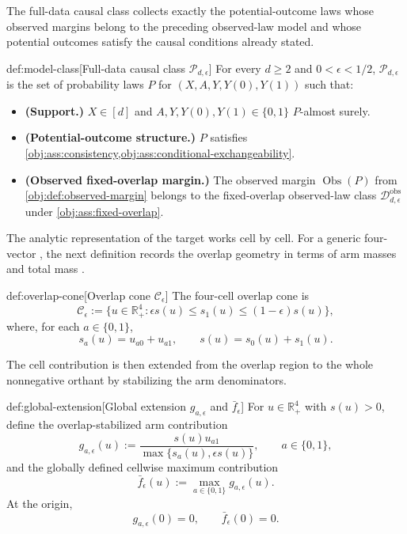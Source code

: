 The full-data causal class collects exactly the potential-outcome laws whose observed margins belong to the preceding observed-law model and whose potential outcomes satisfy the causal conditions already stated.

\begin{definitionv}{def:model-class}[Full-data causal class \(\mathcal P_{d,\epsilon}\)]
For every \(d\geq 2\) and \(0<\epsilon<1/2\), \(\mathcal P_{d,\epsilon}\) is the set of probability laws \(P\) for \((X,A,Y,Y(0),Y(1))\) such that:
\begin{itemize}
\item \textbf{(Support.)} \(X\in[d]\) and \(A,Y,Y(0),Y(1)\in\{0,1\}\) \(P\)-almost surely.
\item \textbf{(Potential-outcome structure.)} \(P\) satisfies \cref{obj:ass:consistency,obj:ass:conditional-exchangeability}.
\item \textbf{(Observed fixed-overlap margin.)} The observed margin \(\operatorname{Obs}(P)\) from \cref{obj:def:observed-margin} belongs to the fixed-overlap observed-law class \(\mathcal D_{d,\epsilon}^{\mathrm{obs}}\) under \cref{obj:ass:fixed-overlap}.
\end{itemize}
\end{definitionv}

The analytic representation of the target works cell by cell. For a generic four-vector , the next definition records the overlap geometry in terms of arm masses  and total mass .

\begin{definitionv}{def:overlap-cone}[Overlap cone \(\mathcal C_\epsilon\)]
The four-cell overlap cone is
\[
\mathcal C_\epsilon
:=
\{u\in\mathbb R_+^4:\epsilon s(u)\leq s_1(u)\leq(1-\epsilon)s(u)\},
\]
where, for each \(a\in\{0,1\}\),
\[
s_a(u)=u_{a0}+u_{a1},
\qquad
s(u)=s_0(u)+s_1(u).
\]
\end{definitionv}

The cell contribution is then extended from the overlap region to the whole nonnegative orthant by stabilizing the arm denominators.

\begin{definitionv}{def:global-extension}[Global extension \(g_{a,\epsilon}\) and \(\bar f_\epsilon\)]
For \(u\in\mathbb R_+^4\) with \(s(u)>0\), define the overlap-stabilized arm contribution
\[
g_{a,\epsilon}(u)
:=
\frac{s(u)u_{a1}}{\max\{s_a(u),\epsilon s(u)\}},
\qquad a\in\{0,1\},
\]
and the globally defined cellwise maximum contribution
\[
\bar f_\epsilon(u)
:=
\max_{a\in\{0,1\}} g_{a,\epsilon}(u).
\]
At the origin,
\[
g_{a,\epsilon}(0)=0,
\qquad
\bar f_\epsilon(0)=0.
\]
\end{definitionv}

